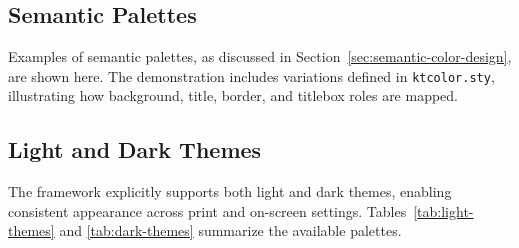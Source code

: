 \documentclass[12pt,onecolumn]{article}
\begin{document}
  \subsection{Semantic Palettes}
  \label{sec:semantic-palettes}
    Examples of semantic palettes, as discussed in Section~\ref{sec:semantic-color-design}, are shown here. The demonstration includes variations defined in \texttt{ktcolor.sty}, illustrating how background, title, border, and titlebox roles are mapped.

  \subsection{Light and Dark Themes}
  \label{sec:light-dark}
    The framework explicitly supports both light and dark themes, enabling consistent appearance across print and on-screen settings. Tables~\ref{tab:light-themes} and \ref{tab:dark-themes} summarize the available palettes.
\end{document}
